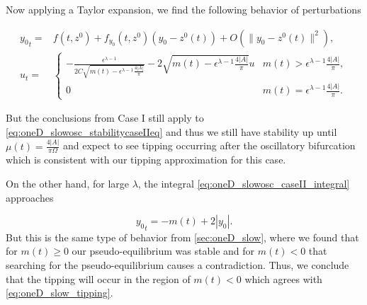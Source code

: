 Now applying a Taylor expansion, we find the following behavior of perturbations

\begin{equation}\label{eq:oneD_slowosc_stabilitycaseIIeq}
\begin{aligned}
{y_0}_t =& f(t,z^0)+f_{y_0}(t,z^0)(y_0-z^0(t))+O(\lVert y_0-z^0(t) \rVert^2),\\
u_t =&\begin{cases}
-\frac{\epsilon^{\lambda-1}}{2C\sqrt{m(t)-\epsilon^{\lambda-1}\frac{4|A|}{\pi}}}-2\sqrt{m(t)-\epsilon^{\lambda-1}\frac{4|A|}{\pi}} u & m(t)>\epsilon^{\lambda-1}\frac{4|A|}{\pi},\\
0 & m(t)=\epsilon^{\lambda-1}\frac{4|A|}{\pi}.
\end{cases}
\end{aligned}
\end{equation}

But the conclusions from Case I still apply to \eqref{eq:oneD_slowosc_stabilitycaseIIeq} and thus we still have stability up until $\mu(t)=\frac{4|A|}{\pi\Omega}$ and expect to see tipping occurring after the oscillatory bifurcation which is consistent with our tipping approximation for this case.

On the other hand, for large $\lambda$, the  integral \eqref{eq:oneD_slowosc_caseII_integral} approaches

\begin{equation}\label{eq:oneD_slowosc_stabilitycaseII}
{y_0}_t=-m(t)+2|y_0|.
\end{equation}
But this is the same type of behavior from \autoref{sec:oneD_slow}, where we found that for $m(t)\ge 0$ our pseudo-equilibrium was stable and for $m(t)<0$ that searching for the pseudo-equilibrium causes a contradiction. Thus, we conclude that the tipping will occur in the region of $m(t)<0$ which agrees with \eqref{eq:oneD_slow_tipping}.
